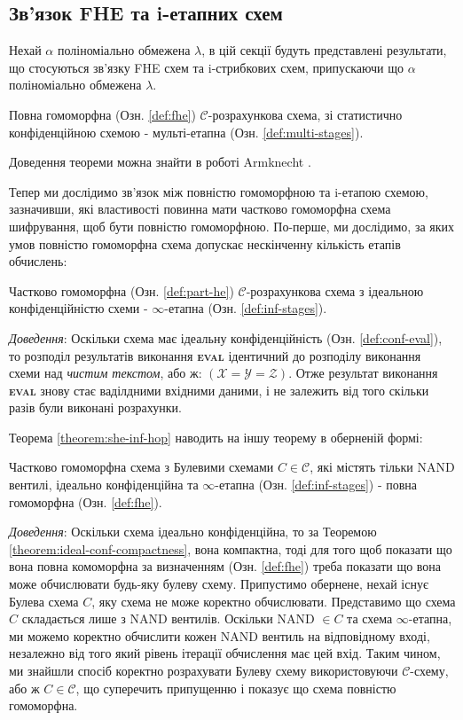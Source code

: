 \subsection{Зв'язок FHE та i-етапних схем}
Нехай \(\alpha\) поліноміально обмежена \(\lambda\), в цій секції будуть представлені
результати, що стосуються зв'язку FHE схем та i-стрибкових схем, припускаючи що \(\alpha\)
поліноміально обмежена \(\lambda\).

\begin{theorem}
    Повна гомоморфна (Озн. \ref{def:fhe}) \(\mathcal{C}\)-розрахункова схема, зі статистично конфіденційною
    схемою - мульті-етапна (Озн. \ref{def:multi-stages}).
\end{theorem}
Доведення теореми можна знайти в роботі Armknecht \cite{cryptoeprint:2015/1192}.

Тепер ми дослідимо зв'язок між повністю гомоморфною та i-етапою схемою, зазначивши, які
властивості повинна мати частково гомоморфна схема шифрування, щоб бути повністю
гомоморфною. По-перше, ми дослідимо, за яких умов повністю гомоморфна схема допускає
нескінченну кількість етапів обчислень:

\begin{theorem}
    \label{theorem:she-inf-hop}
    Частково гомоморфна (Озн. \ref{def:part-he}) \(\mathcal{C}\)-розрахункова схема з
    ідеальною конфіденційністю схеми - \(\infty\)-етапна (Озн. \ref{def:inf-stages}).
\end{theorem}

\emph{Доведення}: Оскільки схема має ідеальну конфіденційність (Озн. \ref{def:conf-eval}),
то розподіл результатів виконання \textsc{\textbf{eval}} ідентичний до розподілу виконання
схеми над \emph{чистим текстом}, або ж: \((\mathcal{X} = \mathcal{Y} = \mathcal{Z})\). Отже
результат виконання \textsc{\textbf{eval}} знову стає ваділдними вхідними даними, і не
залежить від того скільки разів були виконані розрахунки.

Теорема \ref{theorem:she-inf-hop} наводить на іншу теорему в оберненій формі:

\begin{theorem}
    Частково гомоморфна схема з Булевими схемами \(C \in \mathcal{C}\), які містять
    тільки NAND вентилі, ідеально конфіденційна та \(\infty\)-етапна (Озн. \ref{def:inf-stages}) - повна гомоморфна (Озн. \ref{def:fhe}).
\end{theorem}

\emph{Доведення}: Оскільки схема ідеально конфіденційна, то за Теоремою \ref{theorem:ideal-conf-compactness}, вона компактна, тоді для того щоб показати що вона повна комоморфна за
визначенням (Озн. \ref{def:fhe}) треба показати що вона може обчислювати будь-яку
булеву схему. Припустимо обернене, нехай існує Булева схема \(C\), яку схема не може
коректно обчислювати. Представимо що схема \(C\) складається лише з NAND вентилів.
Оскільки NAND \(\in C\) та схема \(\infty\)-етапна, ми можемо коректно обчислити
кожен NAND вентиль на відповідному вході, незалежно від того який рівень ітерації
обчислення має цей вхід. Таким чином, ми знайшли спосіб коректно розрахувати Булеву схему
використовуючи \(\mathcal{C}\)-схему, або ж \(C \in \mathcal{C}\), що суперечить припущенню
і показує що схема повністю гомоморфна.

